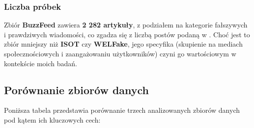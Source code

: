\subsubsection{Liczba próbek}
Zbiór \textbf{BuzzFeed} zawiera \textbf{2 282 artykuły}, z podziałem na kategorie fałszywych i prawdziwych wiadomości, co zgadza się z liczbą postów podaną w \cite{BuzzFace}. Choć jest to zbiór mniejszy niż \textbf{ISOT} czy \textbf{WELFake}, jego specyfika (skupienie na mediach społecznościowych i zaangażowaniu użytkowników) czyni go wartościowym w kontekście moich badań.

\FloatBarrier
\subsection{Porównanie zbiorów danych}
Poniższa tabela przedstawia porównanie trzech analizowanych zbiorów danych pod kątem ich kluczowych cech:

